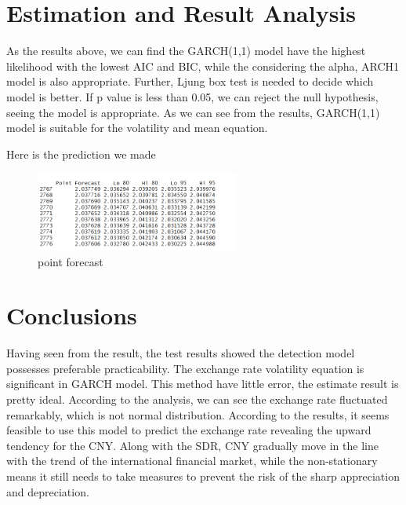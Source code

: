 \documentclass[12pt, a4paper, titlepage]{article}
\begin{document}
\section{Estimation and Result Analysis}
As the results above, we can find the GARCH(1,1) model have the highest likelihood with the lowest AIC and BIC, while the considering the alpha, ARCH1 model is also appropriate. Further, Ljung box test is needed to decide which model is better. If p value is less than 0.05, we can reject the null hypothesis, seeing the model is appropriate. As we can see from the results, GARCH(1,1) model is suitable for the volatility and mean equation.

Here is the prediction we made
\begin{figure}[h!]
\begin{center}
\caption{point forecast}\label{pre}
\includegraphics[width=0.6\textwidth]{pre.png}
\end{center}
\end{figure}


\section{Conclusions}\label{conclusions}
Having seen from the result, the test results showed the detection model possesses preferable practicability. The exchange rate volatility equation is significant in GARCH model.
This method have little error, the estimate result is pretty ideal. According to the analysis, we can see the exchange rate fluctuated remarkably, which is not normal distribution. According to the results, it seems feasible to use this model to predict the exchange rate revealing the upward tendency for the CNY. Along with the SDR, CNY gradually move in the line with the trend of the international financial market, while the non-stationary means it still needs to take measures to prevent the risk of the sharp appreciation and depreciation.\\
\end{document}
